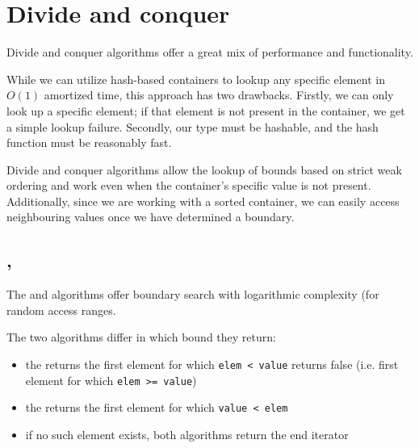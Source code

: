 \section{Divide and conquer}

Divide and conquer algorithms offer a great mix of performance and functionality.

While we can utilize hash-based containers to lookup any specific element in $O(1)$ amortized time, this approach has two drawbacks. Firstly, we can only look up a specific element; if that element is not present in the container, we get a simple lookup failure. Secondly, our type must be hashable, and the hash function must be reasonably fast.

Divide and conquer algorithms allow the lookup of bounds based on strict weak ordering and work even when the container’s specific value is not present. Additionally, since we are working with a sorted container, we can easily access neighbouring values once we have determined a boundary.

\subsection{\texorpdfstring{, }{\texttt{std::lower\_bound}, \texttt{std::upper\_bound}}}

The  and  algorithms offer boundary search with logarithmic complexity (for random access ranges.


\noindent The two algorithms differ in which bound they return:

\begin{itemize}
    \item the  returns the first element for which \texttt{elem < value} returns false (i.e. first element for which \texttt{elem >= value})
    \item the  returns the first element for which \texttt{value < elem}
    \item if no such element exists, both algorithms return the end iterator
\end{itemize}

